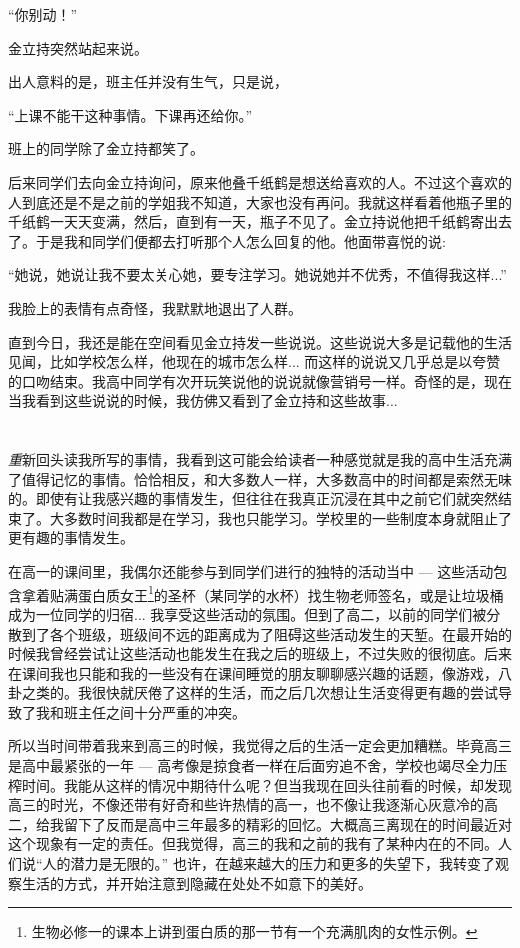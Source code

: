 \documentclass[UTF8,oneside]{ctexbook}
\begin{document}
``你别动！''

金立持突然站起来说。

出人意料的是，班主任并没有生气，只是说，

``上课不能干这种事情。下课再还给你。''

班上的同学除了金立持都笑了。

后来同学们去向金立持询问，原来他叠千纸鹤是想送给喜欢的人。不过这个喜欢的人到底还是不是之前的学姐我不知道，大家也没有再问。我就这样看着他瓶子里的千纸鹤一天天变满，然后，直到有一天，瓶子不见了。金立持说他把千纸鹤寄出去了。于是我和同学们便都去打听那个人怎么回复的他。他面带喜悦的说:

``她说，她说让我不要太关心她，要专注学习。她说她并不优秀，不值得我这样...''

我脸上的表情有点奇怪，我默默地退出了人群。

直到今日，我还是能在空间看见金立持发一些说说。这些说说大多是记载他的生活见闻，比如学校怎么样，他现在的城市怎么样... 而这样的说说又几乎总是以夸赞的口吻结束。我高中同学有次开玩笑说他的说说就像营销号一样。奇怪的是，现在当我看到这些说说的时候，我仿佛又看到了金立持和这些故事...

\chapter{}
{\Large \emph{重}}新回头读我所写的事情，我看到这可能会给读者一种感觉就是我的高中生活充满了值得记忆的事情。恰恰相反，和大多数人一样，大多数高中的时间都是索然无味的。即使有让我感兴趣的事情发生，但往往在我真正沉浸在其中之前它们就突然结束了。大多数时间我都是在学习，我也只能学习。学校里的一些制度本身就阻止了更有趣的事情发生。

在高一的课间里，我偶尔还能参与到同学们进行的独特的活动当中 --- 这些活动包含拿着贴满蛋白质女王\footnote{生物必修一的课本上讲到蛋白质的那一节有一个充满肌肉的女性示例。}的圣杯（某同学的水杯）找生物老师签名，或是让垃圾桶成为一位同学的归宿... 我享受这些活动的氛围。但到了高二，以前的同学们被分散到了各个班级，班级间不远的距离成为了阻碍这些活动发生的天堑。在最开始的时候我曾经尝试让这些活动也能发生在我之后的班级上，不过失败的很彻底。后来在课间我也只能和我的一些没有在课间睡觉的朋友聊聊感兴趣的话题，像游戏，八卦之类的。我很快就厌倦了这样的生活，而之后几次想让生活变得更有趣的尝试导致了我和班主任之间十分严重的冲突。

所以当时间带着我来到高三的时候，我觉得之后的生活一定会更加糟糕。毕竟高三是高中最紧张的一年 --- 高考像是掠食者一样在后面穷追不舍，学校也竭尽全力压榨时间。我能从这样的情况中期待什么呢？但当我现在回头往前看的时候，却发现高三的时光，不像还带有好奇和些许热情的高一，也不像让我逐渐心灰意冷的高二，给我留下了反而是高中三年最多的精彩的回忆。大概高三离现在的时间最近对这个现象有一定的责任。但我觉得，高三的我和之前的我有了某种内在的不同。人们说``人的潜力是无限的。'' 也许，在越来越大的压力和更多的失望下，我转变了观察生活的方式，并开始注意到隐藏在处处不如意下的美好。
\end{document}
